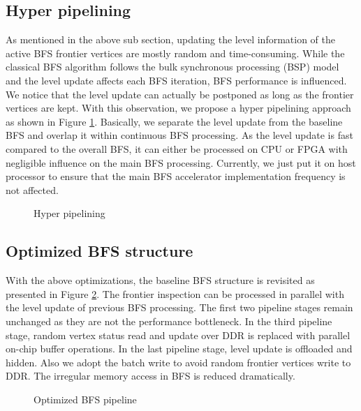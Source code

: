 \subsection{Hyper pipelining}
As mentioned in the above sub section, updating the level information of the active 
BFS frontier vertices are mostly random and time-consuming. While the classical BFS 
algorithm follows the bulk synchronous processing (BSP) model and the level update
affects each BFS iteration, BFS performance is influenced. We notice that the level update 
can actually be postponed as long as the frontier vertices are kept. With this observation, 
we propose a hyper pipelining approach as shown in Figure \ref{fig:hyper}. Basically, 
we separate the level update from the baseline BFS and overlap it within continuous BFS processing.  
As the level update is fast compared to the overall BFS, it can either be processed on CPU or FPGA 
with negligible influence on the main BFS processing. Currently, we just put it on host processor 
to ensure that the main BFS accelerator implementation frequency is not affected.
\begin{figure}
	\caption{Hyper pipelining}
\label{fig:hyper}
\end{figure}

\subsection{Optimized BFS structure}
With the above optimizations, the baseline BFS structure is revisited  
as presented in Figure \ref{fig:opt-bfs}. The frontier inspection can be 
processed in parallel with the level update of previous BFS processing. 
The first two pipeline stages remain unchanged as they are not the 
performance bottleneck. In the third pipeline stage, 
random vertex status read and update over DDR is replaced with parallel 
on-chip buffer operations. In the last pipeline stage, level update is offloaded 
and hidden. Also we adopt the batch write to avoid random frontier vertices 
write to DDR. The irregular memory access in BFS is reduced dramatically.

\begin{figure}
    \caption{Optimized BFS pipeline}
\label{fig:opt-bfs}
\vspace{-1em}
\end{figure}

